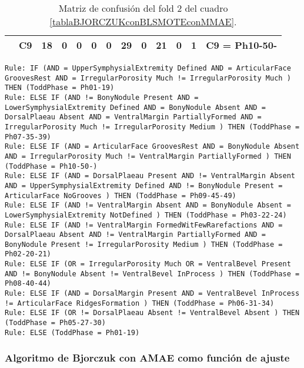\begin{table}[H]
{\begin{tabular}{|ccrrrrrrrrrrc|}
\multicolumn{1}{|c|}{}                                      & \multicolumn{1}{c|}{C9} & \multicolumn{1}{c|}{\textbf{18}} & \multicolumn{1}{c|}{0}  & \multicolumn{1}{c|}{0}  & \multicolumn{1}{c|}{0}  & \multicolumn{1}{c|}{0}  & \multicolumn{1}{c|}{\textbf{29}} & \multicolumn{1}{c|}{0}  & \multicolumn{1}{c|}{\textbf{21}} & \multicolumn{1}{c|}{0}  & \multicolumn{1}{c|}{\textbf{1}}  & C9 = Ph10-50-     \\ \hline
\end{tabular}%
}
\caption{Matriz de confusión del fold 2 del cuadro \ref{tablaBJORCZUKconBLSMOTEconMMAE}.}
\end{table}

\begin{lstlisting}
Rule: IF (AND = UpperSymphysialExtremity Defined AND = ArticularFace GroovesRest AND = IrregularPorosity Much != IrregularPorosity Much ) THEN (ToddPhase = Ph01-19)
Rule: ELSE IF (AND != BonyNodule Present AND = LowerSymphysialExtremity Defined AND = BonyNodule Absent AND = DorsalPlaeau Absent AND = VentralMargin PartiallyFormed AND = IrregularPorosity Much != IrregularPorosity Medium ) THEN (ToddPhase = Ph07-35-39)
Rule: ELSE IF (AND = ArticularFace GroovesRest AND = BonyNodule Absent AND = IrregularPorosity Much != VentralMargin PartiallyFormed ) THEN (ToddPhase = Ph10-50-)
Rule: ELSE IF (AND = DorsalPlaeau Present AND != VentralMargin Absent AND = UpperSymphysialExtremity Defined AND != BonyNodule Present = ArticularFace NoGrooves ) THEN (ToddPhase = Ph09-45-49)
Rule: ELSE IF (AND != VentralMargin Absent AND = BonyNodule Absent = LowerSymphysialExtremity NotDefined ) THEN (ToddPhase = Ph03-22-24)
Rule: ELSE IF (AND != VentralMargin FormedWitFewRarefactions AND = DorsalPlaeau Absent AND != VentralMargin PartiallyFormed AND = BonyNodule Present != IrregularPorosity Medium ) THEN (ToddPhase = Ph02-20-21)
Rule: ELSE IF (OR = IrregularPorosity Much OR = VentralBevel Present AND != BonyNodule Absent != VentralBevel InProcess ) THEN (ToddPhase = Ph08-40-44)
Rule: ELSE IF (AND = DorsalMargin Present AND = VentralBevel InProcess != ArticularFace RidgesFormation ) THEN (ToddPhase = Ph06-31-34)
Rule: ELSE IF (OR != DorsalPlaeau Absent != VentralBevel Absent ) THEN (ToddPhase = Ph05-27-30)
Rule: ELSE (ToddPhase = Ph01-19)
\end{lstlisting}


\subsubsection{Algoritmo de Bjorczuk con AMAE como función de ajuste}

